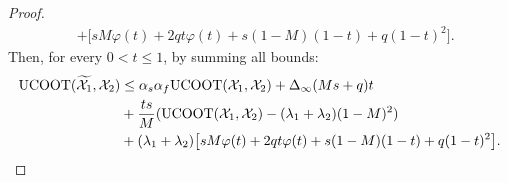 \begin{proof}
\begin{equation}
\begin{split}
       &+ \big[ sM \varphi(t)+ 2q t \varphi(t) + s(1-M)(1-t) + q(1-t)^2 \big].
      \end{split}
    \end{equation}
    Then, for every $0 < t \leq 1$, by summing all bounds:
    \begin{equation}
      \begin{split}
        \text{UCOOT}(\widetilde{\mathcal X_1}, \mathcal X_2) &\leq \alpha_s\alpha_f \text{UCOOT}(\mathcal X_1, \mathcal X_2) +
        \Delta_{\infty}(Ms + q)t \\
        &+ \frac{ts}{M}(\text{UCOOT}(\mathcal X_1, \mathcal X_2) - (\lambda_1 + \lambda_2)(1-M)^2) \\
        &+ (\lambda_1 + \lambda_2) \big[ s M \varphi(t) + 2q t \varphi(t)
        + s(1-M)(1-t) + q(1-t)^2 \big].
      \end{split}
    \end{equation}

\end{proof}
